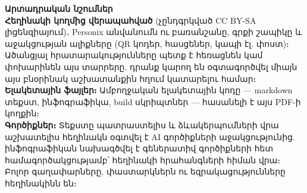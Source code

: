 \clearpage
\thispagestyle{empty}
\begin{flushleft}\small\sffamily
\textbf{Արտադրական նշումներ}\\[1.2em]

\textbf{Հեղինակի կողմից վերապահված} (չընդգրկված CC BY-SA լիցենզիայում)․
Personix անվանումն ու բառանշանը, գրքի շապիկը և աջակցության ալիքները (QR
կոդեր, հասցեներ, կապի էլ. փոստ)։ Ածանցյալ հրատարակությունները պետք է հեռացնեն
կամ փոխարինեն այս տարրերը. դրանք կարող են օգտագործվել միայն այս բնօրինակ աշխատանքին հղում կատարելու համար։\\[1.2em]

\textbf{Ելակետային ֆայլեր։} Ամբողջական ելակետային կոդը --- markdown տեքստ, ինֆոգրաֆիկա,
build սկրիպտներ --- հասանելի է այս PDF-ի կողքին։\\[1.2em]

\textbf{Գործիքներ։} Տեքստը պատրաստելիս և ձևակերպումների վրա աշխատելիս
հեղինակն օգտվել է AI գործիքների աջակցությունից. ինֆոգրաֆիկան նախագծվել է
գեներատիվ գործիքների հետ համագործակցությամբ՝ հեղինակի հրահանգների հիման վրա։
Բոլոր գաղափարները, փաստարկներն ու եզրակացությունները հեղինակինն են։
\end{flushleft}
\clearpage
